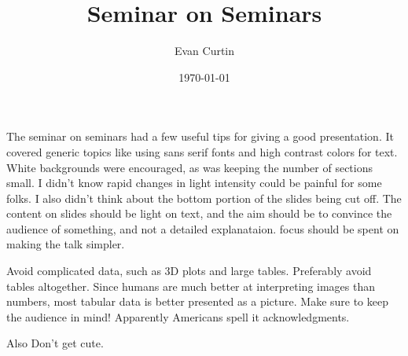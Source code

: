 \documentclass{revtex4}
\begin{document}
\title{Seminar on Seminars}
\author{Evan Curtin}
\date{\today}
\maketitle

The seminar on seminars had a few useful tips for giving a good presentation. It covered generic topics like using sans serif fonts and high
contrast colors for text. White backgrounds were encouraged, as was keeping the number of sections small. 
I didn't know rapid changes in light intensity could be painful for some folks. I also didn't think about the bottom portion of the 
slides being cut off. 
The content on slides should be light on text, and the aim should be to convince the audience of something, and not a detailed explanataion. 
focus should be spent on making the talk simpler. 

Avoid complicated data, such as 3D plots and large tables. Preferably avoid tables altogether. Since humans are much better at interpreting images than numbers, most tabular data is better presented as a picture.  Make sure to keep the audience in mind! Apparently Americans spell it acknowledgments. 


Also Don't get cute. 
\end{document}

